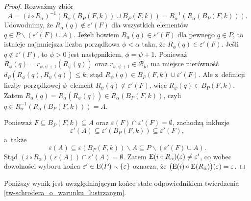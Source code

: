 \begin{proof}
Rozważmy zbiór \[A=\left(i\circ R_\alpha\right)^{-1}\left(R_\alpha(B_P(F,k))\cup B_P(F,k)\right)=R_\alpha^{-1}\left(R_\alpha\left(B_P(F,k)\right)\right).\]
Udowodnimy, że $R_\alpha(q)\not\in \varepsilon'(F)$ dla wszystkich elementów $q\in P\smallsetminus (\varepsilon'(F)\cup A)$. Jeżeli bowiem $R_\alpha(q)\in \varepsilon'(F)$ dla pewnego $q\in P$, to istnieje najmniejsza liczba porządkowa $\phi<\alpha$ taka, że $R_\phi(q)\in \varepsilon'(F)$. Jeśli $q\not\in \varepsilon'(F)$, to $\phi>0$ jest następnikiem, $\phi=\psi+1$. Ponieważ $R_\phi(q)=r_{\psi,\psi+1}\left(R_\psi(q)\right)$ oraz $r_{\psi,\psi+1}\in\mathcal{B}_k$, ma miejsce nierówność $d_P\left(R_\phi(q),R_\psi(q)\right)\leq k$; stąd $R_\psi(q)\in B_P(F,k)\cup\varepsilon'(F)$. Ale z~definicji liczby porządkowej $\phi$~element $R_\psi(q)\not\in\varepsilon'(F)$, więc $R_\psi(q)\in B_P(F,k)$. Zatem $R_\alpha(q)=R_\alpha(R_\psi(q))\in R_\alpha(B_P(F,k))$, czyli $q\in R_\alpha^{-1}(R_\alpha(B_P(F,k)))=A$.

Ponieważ $F\subseteq B_P(F,k)\subseteq A$ oraz $\varepsilon(F)\cap\varepsilon'(F)=\emptyset$, zachodzą inkluzje \[\varepsilon'(A)\subseteq \varepsilon'(B_P(F,k))\subseteq \varepsilon'(F),\] a~także \[\varepsilon(A)\subseteq \varepsilon(B_P(F,k))\smallsetminus A\subseteq P\smallsetminus \left(\varepsilon'(F)\cup A\right).\] Stąd $(i\circ R_\alpha)(\varepsilon(A))\cap \varepsilon'(A)=\emptyset$. Zatem $\mathrm{E}(i\circ R_\alpha)(\varepsilon)\not=\varepsilon'$, co wobec dowolności wyboru końca $\varepsilon'\in \mathrm{E}(P)\smallsetminus\{\varepsilon\}$ oznacza, że $\bigl(\mathrm{E}(i)\circ \mathrm{E}(R_\alpha)\bigr)(\varepsilon)=\varepsilon$. 
\end{proof}

Poniższy wynik jest uwzględniającym końce stałe odpowiednikiem twierdzenia \ref{tw-schrodera_o_warunku_lustrzanym}.

